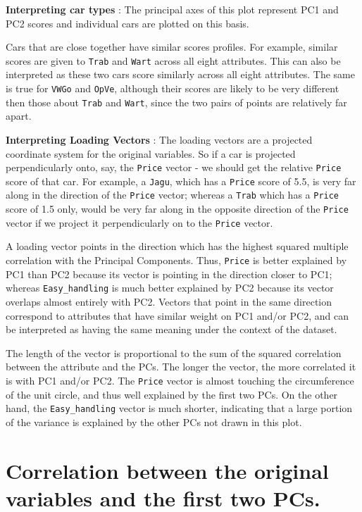 \documentclass[]{article}
\begin{document}
\textbf{Interpreting car types} : The principal axes of this plot
represent PC1 and PC2 scores and individual cars are plotted on this
basis.

Cars that are close together have similar scores profiles. For example,
similar scores are given to \texttt{Trab} and \texttt{Wart} across all
eight attributes. This can also be interpreted as these two cars score
similarly across all eight attributes. The same is true for
\texttt{VWGo} and \texttt{OpVe}, although their scores are likely to be
very different then those about \texttt{Trab} and \texttt{Wart}, since
the two pairs of points are relatively far apart.

\textbf{Interpreting Loading Vectors} : The loading vectors are a
projected coordinate system for the original variables. So if a car is
projected perpendicularly onto, say, the \texttt{Price} vector - we
should get the relative \texttt{Price} score of that car. For example, a
\texttt{Jagu}, which has a \texttt{Price} score of 5.5, is very far
along in the direction of the \texttt{Price} vector; whereas a
\texttt{Trab} which has a \texttt{Price} score of 1.5 only, would be
very far along in the opposite direction of the \texttt{Price} vector if
we project it perpendicularly on to the \texttt{Price} vector.

A loading vector points in the direction which has the highest squared
multiple correlation with the Principal Components. Thus, \texttt{Price}
is better explained by PC1 than PC2 because its vector is pointing in
the direction closer to PC1; whereas \texttt{Easy\_handling} is much
better explained by PC2 because its vector overlaps almost entirely with
PC2. Vectors that point in the same direction correspond to attributes
that have similar weight on PC1 and/or PC2, and can be interpreted as
having the same meaning under the context of the dataset.

The length of the vector is proportional to the sum of the squared
correlation between the attribute and the PCs. The longer the vector,
the more correlated it is with PC1 and/or PC2. The \texttt{Price} vector
is almost touching the circumference of the unit circle, and thus well
explained by the first two PCs. On the other hand, the
\texttt{Easy\_handling} vector is much shorter, indicating that a large
portion of the variance is explained by the other PCs not drawn in this
plot.\\

\section{Correlation between the original variables and the first two
PCs.}\label{correlation-between-the-original-variables-and-the-first-two-pcs.}
\end{document}
